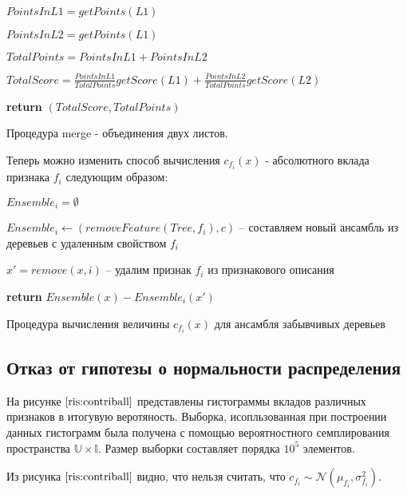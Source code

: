 \documentclass[12pt,a4paper]{report}
\begin{document}
\begin{algorithm}[H]
\SetAlgoLined
{}
$PointsInL1 = getPoints(L1)$

$PointsInL2 = getPoints(L1)$

$TotalPoints = PointsInL1 + PointsInL2$

$TotalScore = \frac{PointsInL1}{TotalPoints}getScore(L1) + \frac{PointsInL2}{TotalPoints}getScore(L2)$

\textbf{return} $(TotalScore, TotalPoints)$
\caption{Процедура merge - объединения двух листов.}
\label{alg:MLFS}
\end{algorithm}

Теперь можно изменить способ вычисления $c_{f_i}(x)$ - абсолютного вклада признака $f_i$ следующим образом:

\begin{algorithm}[H]
\SetAlgoLined
{}

$Ensemble_i = \emptyset$

 {

	$Ensemble_i \leftarrow (removeFeature(Tree, f_i), c)$ -- составляем новый ансамбль из деревьев с удаленным свойством $f_i$
	
}
 
$x' = remove(x, i)$ -- удалим признак $f_i$ из признакового описания

\textbf{return} $Ensemble(x) - Ensemble_i(x')$
\caption{Процедура вычисления величины $c_{f_i}(x)$ для ансамбля забывчивых деревьев}
\label{alg:CFIOT}
\end{algorithm}

\subsection{Отказ от гипотезы о нормальности распределения}
На рисунке $\ref{ris:contriball}$ представлены гистограммы вкладов различных признаков в итогувую веротяность. Выборка, исопльзованная при построении данных гистограмм была получена с помощью вероятностного семплирования пространства $\mathbb{U} \times \mathbb{I}$. Размер выборки составляет порядка $10^5$ элементов.

Из рисунка $\ref{ris:contriball}$ видно, что нельзя считать, что  $c_{f_i} \sim \mathcal{N}(\mu_{f_i}, \sigma_{f_i}^2)$.
\end{document}
